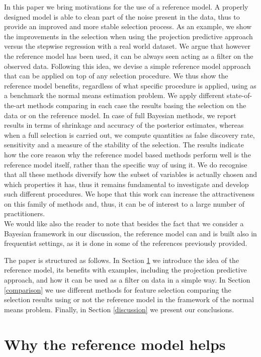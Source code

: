 \documentclass[american,]{article}
\theoremstyle{definition}
\begin{document}
In this paper we bring motivations for the use of a reference model. A properly designed model is able to clean part of the noise present in the data, thus to provide an improved and more stable selection process. As an example, we show the improvements in the selection when using the projection predictive approach versus the stepwise regression with a real world dataset. We argue that however the reference model has been used, it can be always seen acting as a filter on the observed data. Following this idea, we devise a simple reference model approach that can be applied on top of any selection procedure. We thus show the reference model benefits, regardless of what specific procedure is applied, using as a benchmark the normal means estimation problem. We apply different state-of-the-art methods comparing in each case the results basing the selection on the data or on the reference model. In case of full Bayesian methods, we report results in terms of shrinkage and accuracy of the posterior estimates, whereas when a full selection is carried out, we compute quantities as false discovery rate, sensitivity and a measure of the stability of the selection. The results indicate how the core reason why the reference model based methods perform well is the reference model itself, rather than the specific way of using it. We do recognise that all these methods diversify how the subset of variables is actually chosen and which properties it has, thus it remains fundamental to investigate and develop such different procedures. We hope that this work can increase the attractiveness on this family of methods and, thus, it can be of interest to a large number of practitioners.
\\
We would like also the reader to note that besides the fact that we consider a Bayesian framework in our discussion, the reference model can and is built also in frequentist settings, as it is done in some of the references previously provided.

The paper is structured as follows. In Section \ref{reference-model-approach} we introduce the idea of the reference model, its benefits with examples, including the projection predictive approach, and how it can be used as a filter on data in a simple way. In Section \ref{comparison} we use different methods for feature selection comparing the selection results using or not the reference model in the framework of the normal means problem. Finally, in Section \ref{discussion} we present our conclusions.

\hypertarget{reference-model-approach}{%
\section{Why the reference model helps}\label{reference-model-approach}}
\end{document}
